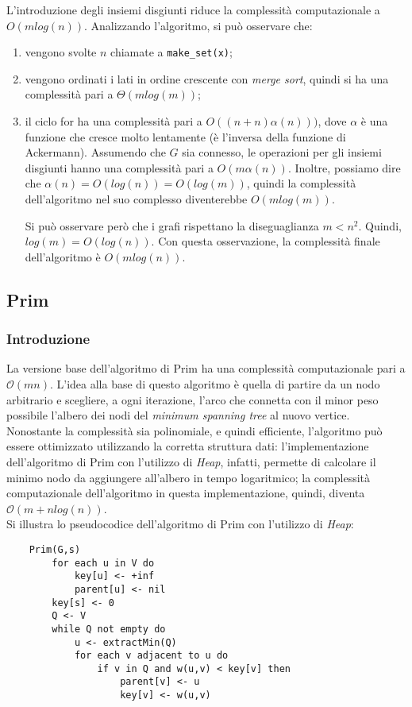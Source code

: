 L'introduzione degli insiemi disgiunti riduce la complessità computazionale
a $O(m log(n))$. Analizzando l'algoritmo, si può osservare che:
\begin{enumerate}
    \item vengono svolte $n$ chiamate a \verb|make_set(x)|;
    \item vengono ordinati i lati in ordine crescente con \textit{merge sort},
    quindi si ha una complessità pari a $\Theta(m log(m))$;
    \item il ciclo for ha una complessità pari a $O((n + n)\alpha(n)))$,
    dove $\alpha$ è una funzione che cresce molto lentamente (è l'inversa
    della funzione di Ackermann). Assumendo che $G$ sia connesso, le
    operazioni per gli insiemi disgiunti hanno una complessità pari a
    $O(m\alpha(n))$. Inoltre, possiamo dire che
    $\alpha(n) = O(log(n)) = O(log(m))$, quindi la complessità dell'algoritmo
    nel suo complesso diventerebbe $O(m log(m))$.

    Si può osservare però che i grafi rispettano la diseguaglianza $m < n^2$.
    Quindi, $log(m) = O(log(n))$. Con questa osservazione, la complessità
    finale dell'algoritmo è $O(m log(n))$.
\end{enumerate}

\subsection{Prim}

\subsubsection{Introduzione}

La versione base dell'algoritmo di Prim ha una complessità computazionale
pari a $\mathcal{O}(mn)$. L'idea alla base di questo algoritmo è quella di partire da un
nodo arbitrario e scegliere, a ogni iterazione, l'arco che connetta con il minor peso possibile
l'albero dei nodi del \textit{minimum spanning tree} al nuovo vertice. \\
Nonostante la complessità sia polinomiale, e quindi efficiente, l'algoritmo può essere ottimizzato
utilizzando la corretta struttura dati: l'implementazione dell'algoritmo di Prim con l'utilizzo di
\textit{Heap}, infatti, permette di calcolare il minimo nodo da aggiungere all'albero in tempo logaritmico;
la complessità computazionale dell'algoritmo in questa implementazione, quindi, diventa \newline $\mathcal{O}(m+n log(n))$. \\
Si illustra lo pseudocodice dell'algoritmo di Prim con l'utilizzo di \textit{Heap}:
\newpage
\begin{verbatim}
    Prim(G,s)
        for each u in V do
            key[u] <- +inf
            parent[u] <- nil
        key[s] <- 0
        Q <- V
        while Q not empty do
            u <- extractMin(Q)
            for each v adjacent to u do
                if v in Q and w(u,v) < key[v] then
                    parent[v] <- u
                    key[v] <- w(u,v)
\end{verbatim}

